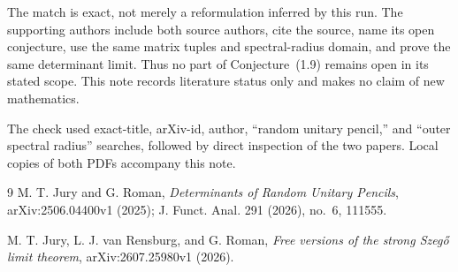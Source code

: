 \documentclass[11pt]{article}
\begin{document}
The match is exact, not merely a reformulation inferred by this run.  The
supporting authors include both source authors, cite the source, name its open
conjecture, use the same matrix tuples and spectral-radius domain, and prove
the same determinant limit.  Thus no part of Conjecture~(1.9) remains open in
its stated scope.  This note records literature status only and makes no claim
of new mathematics.

The check used exact-title, arXiv-id, author, ``random unitary pencil,'' and
``outer spectral radius'' searches, followed by direct inspection of the two
papers.  Local copies of both PDFs accompany this note.

\begin{thebibliography}{9}
M. T. Jury and G. Roman,
\emph{Determinants of Random Unitary Pencils},
arXiv:2506.04400v1 (2025); J. Funct. Anal. 291 (2026), no.~6, 111555.

M. T. Jury, L. J. van Rensburg, and G. Roman,
\emph{Free versions of the strong Szeg\H{o} limit theorem},
arXiv:2607.25980v1 (2026).
\end{thebibliography}
\end{document}
